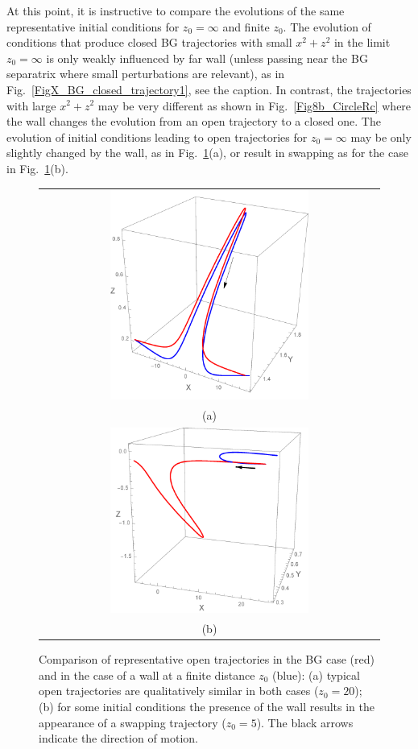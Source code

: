 At this point, it is instructive to compare the evolutions of the same representative initial conditions for $z_0=\infty$ and finite $z_0$.
The evolution of conditions that produce closed BG trajectories with small $x^2+z^2$ in the limit $z_0=\infty$ is only weakly influenced by far wall (unless passing near the BG separatrix where small perturbations are relevant), as in Fig.~\ref{FigX_BG_closed_trajectory1}, see the caption. In contrast, the trajectories with large $x^2+z^2$ may be very different as shown in Fig.~\ref{Fig8b_CircleRc} where the wall changes the evolution from an open trajectory to a closed one. The evolution of initial conditions leading to open trajectories for $z_0=\infty$
may be only slightly changed by the wall, as in Fig.~\ref{comparison}(a), or result in swapping as for the case in Fig.~\ref{comparison}(b).
\begin{figure}
  \centering
  \begin{tabular}{c}    
\includegraphics[width=0.6\textwidth]{Fig8c.pdf} \\ (a) \\
\includegraphics[width=0.6\textwidth]{Fig8d.pdf} \\ (b) 
\end{tabular}
\caption{Comparison of representative open trajectories in the BG case (red) and in the case of a wall at a finite distance $z_0$ (blue): (a) typical open trajectories are qualitatively similar in both cases  ($z_0=20$); (b) for some initial conditions the presence of the wall results in the appearance of a swapping trajectory  ($z_0=5$). The black arrows indicate the direction of motion.}
\label{comparison}
\end{figure}



